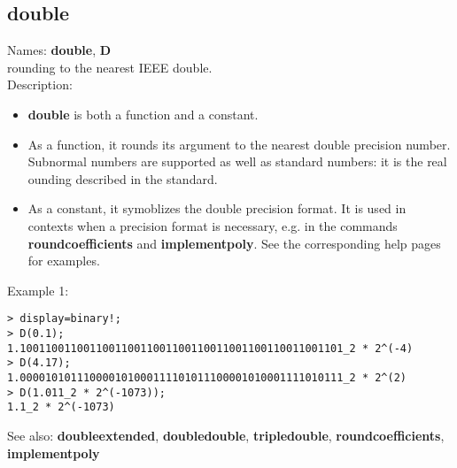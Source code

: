 \subsection{ double }
\noindent Names: \textbf{double}, \textbf{D}\\
rounding to the nearest IEEE double.\\

\noindent Description: \begin{itemize}

\item \textbf{double} is both a function and a constant.

\item As a function, it rounds its argument to the nearest double precision number.
   Subnormal numbers are supported as well as standard numbers: it is the real
   ounding described in the standard.

\item As a constant, it symoblizes the double precision format. It is used in 
   contexts when a precision format is necessary, e.g. in the commands 
   \textbf{roundcoefficients} and \textbf{implementpoly}.
   See the corresponding help pages for examples.
\end{itemize}
\noindent Example 1: 
\begin{center}\begin{minipage}{15cm}\begin{Verbatim}[frame=single]
> display=binary!;
> D(0.1);
1.100110011001100110011001100110011001100110011001101_2 * 2^(-4)
> D(4.17);
1.000010101110000101000111101011100001010001111010111_2 * 2^(2)
> D(1.011_2 * 2^(-1073));
1.1_2 * 2^(-1073)
\end{Verbatim}
\end{minipage}\end{center}
See also: \textbf{doubleextended}, \textbf{doubledouble}, \textbf{tripledouble}, \textbf{roundcoefficients}, \textbf{implementpoly}
